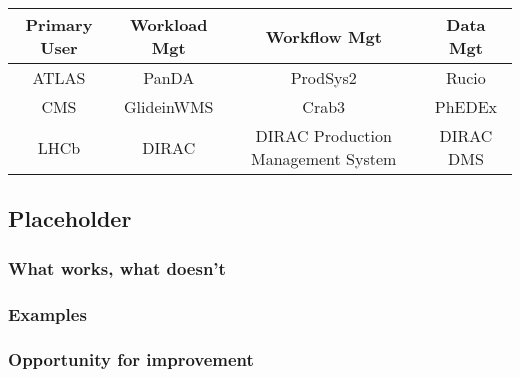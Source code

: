 \begin{center}
  \begin{tabular}{  c | c | c | c }
    \hline
    Primary User & Workload Mgt & Workflow Mgt & Data Mgt\\ \hline
    ATLAS & PanDA & ProdSys2 & Rucio\\ \hline
    CMS  & GlideinWMS & Crab3 & PhEDEx\\ \hline
    LHCb  & DIRAC & DIRAC Production Management System & DIRAC DMS\\ \hline
    \hline
  \end{tabular}
\end{center}

\subsection{Placeholder}
\subsubsection{What works, what doesn't}
\subsubsection{Examples}
\subsubsection{Opportunity for improvement}
